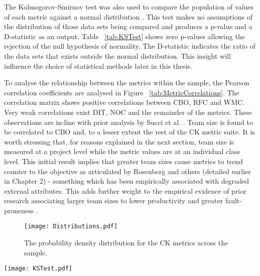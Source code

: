 The Kolmogorov-Smirnov test was also used to compare the population of values of each metric against a normal distribution \citep{kolmogorov1933sulla, smirnov1948table}. This test makes no assumptions of the distribution of those data sets being compared and produces a p-value and a D-statistic as an output. Table ~\ref{tab:KSTest} shows zero p-values allowing the rejection of the null hypothesis of normality. The D-statistic indicates the ratio of the data sets that exists outside the normal distribution. This insight will influence the choice of statistical methods later in this thesis.

To analyse the relationship between the metrics within the sample, the Pearson correlation coefficients are analysed in Figure ~\ref{tab:MetricCorrelations}. The correlation matrix shows positive correlations between CBO, RFC and WMC. Very weak correlations exist DIT, NOC and the remainder of the metrics. These observations are in-line with prior analysis by Succi et al. \citep{succi2005empirical}. Team size is found to be correlated to CBO and, to a lesser extent the rest of the CK metric suite. It is worth stressing that, for reasons explained in the next section, team size is measured at a project level while the metric values are at an individual class level. This initial result implies that greater team sizes cause metrics to trend counter to the objective as articulated by Rosenberg and others (detailed earlier in Chapter 2) - something which has been empirically associated with degraded external attributes. This adds further weight to the empirical evidence of prior research associating larger team sizes to lower productivity \citep{pendharkar2009relationship} and greater fault-proneness \citep{nagappan2008influence, caglayan2015merits}.

\begin{figure}[htbp!] 
\centering    
\texttt{[image: Distributions.pdf]}
\caption{The probability density distribution for the CK metrics across the sample.}
\label{fig:Distributions}
\end{figure}

\begin{table}
\centering 
{}
\begin{tabular}
 \centering 
 \texttt{[image: KSTest.pdf]}
 \label{tab:KSTest}
\end{tabular}
\end{table}

